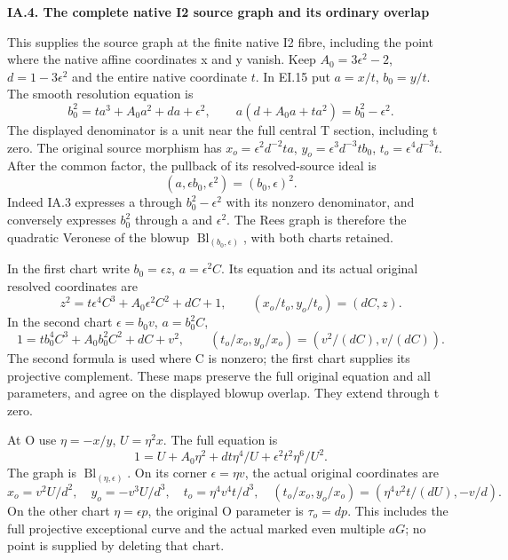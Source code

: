 \medskip\noindent\textbf{IA.4. The complete native I2 source graph and its ordinary overlap}

\par\nobreak

This supplies the source graph at the finite native I2 fibre,
including the point where the native affine coordinates x and y
vanish. Keep \(A_0=3\epsilon^2-2\), \(d=1-3\epsilon^2\)
and the entire native coordinate \(t\). In EI.15 put
\(a=x/t\), \(b_0=y/t\). The smooth resolution equation is
\[
 b_0^2=t a^3+A_0a^2+da+\epsilon^2,
 \qquad a(d+A_0a+t a^2)=b_0^2-\epsilon^2.
\tag{IA.3}
\]
The displayed denominator is a unit near the full central T
section, including t zero. The original source morphism has
\(x_o=\epsilon^2d^{-2}ta\),
\(y_o=\epsilon^3d^{-3}tb_0\),
\(t_o=\epsilon^4d^{-3}t\). After the common factor, the
pullback of its resolved-source ideal is
\[
 (a,\epsilon b_0,\epsilon^2)=(b_0,\epsilon)^2.
\tag{IA.4}
\]
Indeed IA.3 expresses a through \(b_0^2-\epsilon^2\)
with its nonzero denominator, and conversely expresses
\(b_0^2\) through a and \(\epsilon^2\). The Rees graph is
therefore the quadratic Veronese of the blowup
\(\operatorname{Bl}_{(b_0,\epsilon)}\), with both charts
retained.

In the first chart write \(b_0=\epsilon z\),
\(a=\epsilon^2 C\). Its equation and its actual original
resolved coordinates are
\[
 z^2=t\epsilon^4C^3+A_0\epsilon^2C^2+dC+1,
 \qquad (x_o/t_o,y_o/t_o)=(dC,z).
\tag{IA.5}
\]
In the second chart \(\epsilon=b_0v\), \(a=b_0^2C\),
\[
 1=t b_0^4C^3+A_0b_0^2C^2+dC+v^2,
 \qquad(t_o/x_o,y_o/x_o)
       =(v^2/(dC),v/(dC)).
\tag{IA.6}
\]
The second formula is used where C is nonzero; the first
chart supplies its projective complement. These maps preserve
the full original equation and all parameters, and agree on
the displayed blowup overlap. They extend through t zero.

At O use \(\eta=-x/y\), \(U=\eta^2x\). The full equation is
\[
 1=U+A_0\eta^2+dt\eta^4/U
                    +\epsilon^2t^2\eta^6/U^2.
\tag{IA.7}
\]
The graph is \(\operatorname{Bl}_{(\eta,\epsilon)}\).
On its corner \(\epsilon=\eta v\), the actual original
coordinates are
\[
 x_o=v^2U/d^2,\quad y_o=-v^3U/d^3,\quad
 t_o=\eta^4v^4t/d^3,
 \quad (t_o/x_o,y_o/x_o)
       =(\eta^4v^2t/(dU),-v/d).
\tag{IA.8}
\]
On the other chart \(\eta=\epsilon p\), the original
O parameter is \(\tau_o=dp\). This includes the full
projective exceptional curve and the actual marked even
multiple \(aG\); no point is supplied by deleting that chart.

